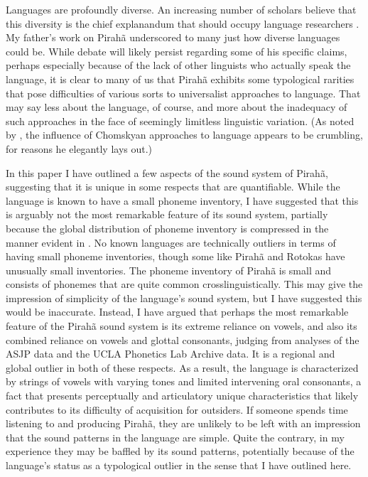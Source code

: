 \documentclass[output=paper,colorlinks,citecolor=brown
]{langscibook}
\begin{document}
    Languages are profoundly diverse. An increasing number of scholars believe that this diversity
    is the chief explanandum that should occupy language researchers \citep{evans2009myth}. My father’s work on Pirahã underscored to many just how diverse languages could be. While debate will likely persist regarding some of his specific claims, perhaps especially because of the lack of other linguists who actually speak the language, it is clear to many of us that Pirahã exhibits some typological rarities that pose difficulties of various sorts to universalist approaches to language. That may say less about the language, of course, and more about the inadequacy of such approaches in the face of seemingly limitless linguistic variation. (As noted by , the influence of Chomskyan approaches to language appears to be crumbling, for reasons he elegantly lays out.)\largerpage
    
    In this paper I have outlined a few aspects of the sound system of Pirahã, suggesting that it is unique in some respects that are quantifiable. While the language is known to have a small phoneme inventory, I have suggested that this is arguably not the most remarkable feature of its sound system, partially because the global distribution of phoneme inventory is compressed in the manner evident in . No known languages are technically outliers in terms of having small phoneme inventories, though some like Pirahã and Rotokas have unusually small inventories.  The phoneme inventory of Pirahã is small and consists of phonemes that are quite common crosslinguistically. This may give the impression of simplicity of the language’s sound system, but I have suggested this would be inaccurate. Instead, I have argued that perhaps the most remarkable feature of the Pirahã sound system is its extreme reliance on vowels, and also its combined reliance on vowels and glottal consonants, judging from analyses of the ASJP data and the UCLA Phonetics Lab Archive data. It is a regional and global outlier in both of these respects. As a result, the language is characterized by strings of vowels with varying tones and limited intervening oral consonants, a fact that presents perceptually and articulatory unique characteristics that likely contributes to its difficulty of acquisition for outsiders. If someone spends time listening to and producing Pirahã, they are unlikely to be left with an impression that the sound patterns in the language are simple. Quite the contrary, in my experience they may be baffled by its sound patterns, potentially because of the language’s status as a typological outlier in the sense that I have outlined here.

\printbibliography[heading=subbibliography,notkeyword=this]
\end{document}
